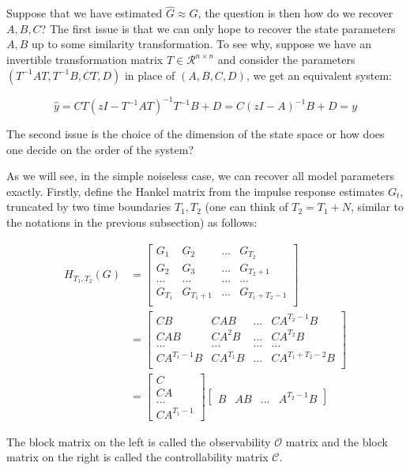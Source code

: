 \documentclass{article}[12pt]
\begin{document}
Suppose that we have estimated $\hat{G} \approx G$, the question is then how do we recover $A, B, C$? The first issue is that we can only hope to recover the state parameters $A, B$ up to some similarity transformation. To see why, suppose we have an invertible transformation matrix $T \in \mathcal{R}^{n\times n}$ and consider the parameters $(T^{-1}AT, T^{-1}B, CT, D)$ in place of $(A, B, C, D)$, we get an equivalent system:

$$\hat{y} = CT(zI - T^{-1}AT)^{-1}T^{-1}B+D = C(zI-A)^{-1}B+D = y$$

The second issue is the choice of the dimension of the state space or how does one decide on the order of the system? 

As we will see, in the simple noiseless case, we can recover all model parameters exactly. Firstly, define the Hankel matrix from the impulse response estimates $G_t$, truncated by two time boundaries $T_1, T_2$ (one can think of $T_2 = T_1 + N$, similar to the notations in the previous subsection) as follows:

\begin{align*}
    H_{T_1, T_2}(G) &= \begin{bmatrix}
    G_1 &G_2 &... &G_{T_2}\\
    G_2 &G_3 &... &G_{T_2+1}\\
    ... &... &... &...\\
    G_{T_1} &G_{T_1+1} &... &G_{T_1+T_2-1}\\
    \end{bmatrix}\\
    &= \begin{bmatrix}
    CB &CAB &... &CA^{T_2-1}B\\
    CAB &CA^2B &... &CA^{T_2}B\\
    ... &... &... &...\\
    CA^{T_1-1}B &CA^{T_1}B &... &CA^{T_1+T_2-2}B\\
    \end{bmatrix}\\
    &= \begin{bmatrix}
    C\\ CA\\...\\CA^{T_1-1}
    \end{bmatrix}\begin{bmatrix}B &AB &... &A^{T_2-1}B
    \end{bmatrix}
\end{align*}

The block matrix on the left is called the observability $\mathcal{O}$ matrix and the block matrix on the right is called the controllability matrix $\mathcal{C}$. 
\end{document}
